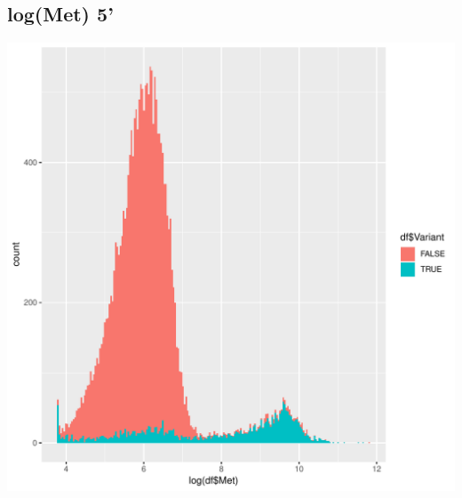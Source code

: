 \documentclass{article}\usepackage[]{graphicx}\usepackage[]{color}
\newenvironment{knitrout}{}{} %
\begin{document}
\subsection{log(Met) 5'}
\begin{knitrout}
\color{fgcolor}

{\centering \includegraphics[width=1\linewidth]{figure/minimal-dens_5_met-1} 

}



\end{knitrout}
\clearpage
\end{document}
